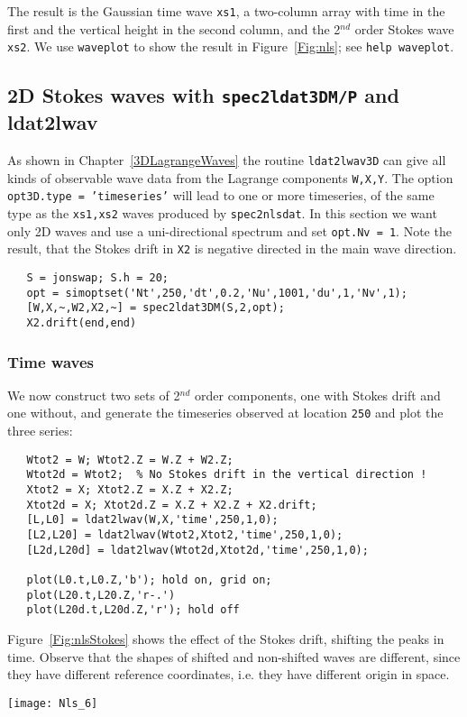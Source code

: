 \noindent
The result is the Gaussian time wave {\tt xs1}, a two-column array with time in the first and the vertical 
height in the second column, and the 2$^{nd}$ order Stokes wave 
{\tt xs2}.  We use {\tt waveplot} to show the result in 
Figure~\ref{Fig:nls}; see {\tt help waveplot}.

\subsection{2D Stokes waves with {\tt spec2ldat3DM/P} and {ldat2lwav}}
As shown in Chapter~\ref{3DLagrangeWaves} the routine {\tt ldat2lwav3D} 
can give all kinds of observable wave data from the Lagrange 
components {\tt W,X,Y}. The option {\tt opt3D.type = 'timeseries'} will lead to one or more 
timeseries, of the same type as the {\tt xs1,xs2} waves produced by {\tt spec2nlsdat}. 
In this section we want only 2D waves and use a uni-directional spectrum and set {\tt opt.Nv = 1}. 
Note the result,  that the Stokes drift in {\tt X2} is negative directed in the main wave direction. 
{\small\begin{verbatim}
   S = jonswap; S.h = 20;
   opt = simoptset('Nt',250,'dt',0.2,'Nu',1001,'du',1,'Nv',1);
   [W,X,~,W2,X2,~] = spec2ldat3DM(S,2,opt);
   X2.drift(end,end) 
\end{verbatim}
}

\subsubsection*{Time waves}
We now construct two sets of 2$^{nd}$ order components, one with Stokes drift and one without, and 
generate the timeseries observed at location {\tt 250} and plot the three series:
{\small\begin{verbatim}
   Wtot2 = W; Wtot2.Z = W.Z + W2.Z;
   Wtot2d = Wtot2;  % No Stokes drift in the vertical direction ! 
   Xtot2 = X; Xtot2.Z = X.Z + X2.Z;
   Xtot2d = X; Xtot2d.Z = X.Z + X2.Z + X2.drift;
   [L,L0] = ldat2lwav(W,X,'time',250,1,0);
   [L2,L20] = ldat2lwav(Wtot2,Xtot2,'time',250,1,0);
   [L2d,L20d] = ldat2lwav(Wtot2d,Xtot2d,'time',250,1,0);

   plot(L0.t,L0.Z,'b'); hold on, grid on;
   plot(L20.t,L20.Z,'r-.')
   plot(L20d.t,L20d.Z,'r'); hold off
\end{verbatim}
}

Figure~\ref{Fig:nlsStokes} shows the effect of the Stokes drift, shifting the peaks in time. Observe that the 
shapes of shifted and non-shifted waves are different, since they have different reference coordinates, i.e. 
they have different origin in space. 
\begin{SCfigure}[0.8][b]
\texttt{[image: Nls\_6]}
\caption{Time waves:  1$^{st}$ order (blue) and 2$^{nd}$ order with (red, solid) and without (red, dashed) Stokes drift.}
\label{Fig:nlsStokes}
\end{SCfigure}

